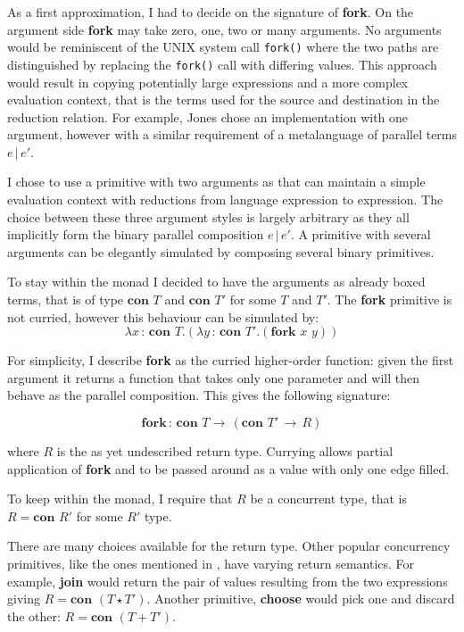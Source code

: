 \documentclass[12pt,twoside,notitlepage]{report}
\theoremstyle{plain}%
\theoremstyle{definition}
\theoremstyle{remark}
\begin{document}
As a first approximation, I had to decide on the signature of \textbf{fork}. On the argument side \textbf{fork} may take zero, one, two or many arguments. No arguments would be reminiscent of the UNIX system call \verb|fork()| where the two paths are distinguished by replacing the \verb|fork()| call with differing values. This approach would result in copying potentially large expressions and a more complex evaluation context, that is the terms used for the source and destination in the reduction relation. For example, Jones\cite{hoareetal2001tackling} chose an implementation with one argument, however with a similar requirement of a metalanguage of parallel terms $ e \, | \, e' $. 


I chose to use a primitive with two arguments as that can maintain a simple evaluation context with reductions from language expression to expression. The choice between these three argument styles is largely arbitrary as they all implicitly form the binary parallel composition $ e \, | \, e' $. A primitive with several arguments can be elegantly simulated by composing several binary primitives.

To stay within the monad I decided to have the arguments as already boxed terms, that is of type $ \textbf{con } T $ and $ \textbf{con } T' $ for some $ T$ and $T' $. The \textbf{fork} primitive is not curried, however this behaviour can be simulated by:
\[ \lambda x \,:\,\textbf{con }T.(\lambda y \,:\,\textbf{con }T'.(\textbf{fork}\,\,x\,\,y)) \]

For simplicity, I describe \textbf{fork} as the curried higher-order function: given the first argument it returns a function that takes only one parameter and will then behave as the parallel composition. This gives the following signature:

\[ \textbf{fork} \, : \, \textbf{con } T \rightarrow \, (\textbf{con } T'\, \rightarrow\, R ) \tag{T-Fork1} \]  

where $ R $ is the as yet undescribed return type. Currying allows partial application of \textbf{fork} and to be passed around as a value with only one edge filled. 

To keep within the monad, I require that $ R $ be a concurrent type, that is $ R =  \textbf{con } R' $ for some $ R' $ type. 

There are many choices available for the return type. Other popular concurrency primitives, like the ones mentioned in , have varying return semantics. For example, \textbf{join} would return the pair of values resulting from the two expressions giving $ R = \textbf{con }(T \star T') $. Another primitive, \textbf{choose} would pick one and discard the other: $ R = \textbf{con }(T + T') $. 
\end{document}
